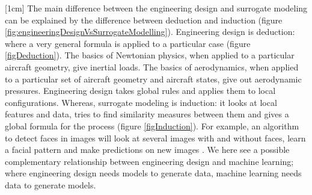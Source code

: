 [1cm]
The main difference between the engineering design and surrogate modeling can be explained by the difference between deduction and induction \cite{domingos2012few} (figure \ref{fig:engineeringDesignVsSurrogateModelling}). Engineering design is deduction: where a very general formula is applied to a particular case (figure \ref{figDeduction}). The basics of Newtonian physics, when applied to a particular aircraft geometry, give inertial loads. The basics of aerodynamics, when applied to a particular set of aircraft geometry and aircraft states, give out aerodynamic pressures. Engineering design takes global rules and applies them to local configurations. Whereas, surrogate modeling is induction: it looks at local features and data, tries to find similarity measures between them and gives a global formula for the process (figure \ref{figInduction}). For example, an algorithm to detect faces in images will look at several images with and without faces, learn a facial pattern and make predictions on new images \cite{marszalek2007semantic}. We here see a possible complementary relationship between engineering design and machine learning; where engineering design needs models to generate data, machine learning needs data to generate models.

